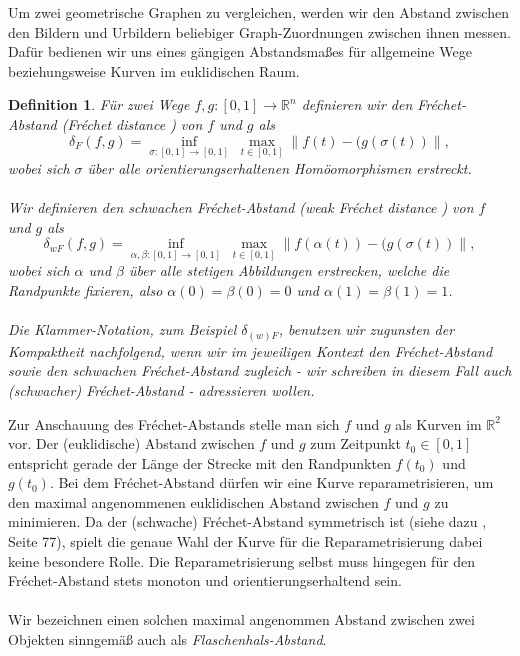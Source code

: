 \documentclass[a4paper, 12pt, twoside]{article}
\theoremstyle{Format1} %
\newtheorem{Def}{Definition}[section]       %
\begin{document}
	Um zwei geometrische Graphen zu vergleichen, werden wir den Abstand zwischen den Bildern und Urbildern beliebiger Graph-Zuordnungen zwischen ihnen
	messen. Dafür bedienen wir uns eines gängigen Abstandsmaßes für allgemeine Wege beziehungsweise Kurven im euklidischen Raum.

\begin{Def} \label{Definition Fréchet-Abstand}
	Für zwei Wege $ f, g: [0,1] \to \mathbb{R}^n $ definieren wir den \textit{Fréchet-Abstand (Fréchet distance \cite{Akitaya})} von $f$ und $g$ als
	$$ \delta_F(f,g) =  \inf_{\sigma:[0,1] \to [0,1]} \; \max_{t \in [0,1]} \lVert f(t)-(g(\sigma(t)) \rVert, $$
	wobei sich $\sigma $ über alle orientierungserhaltenen Homöomorphismen erstreckt.
	\\
	\\
	Wir definieren den \textit{schwachen Fréchet-Abstand (weak Fréchet distance \cite{Akitaya})} von $f$ und $g$ als
	$$\delta_{wF}(f,g) =\inf_{\alpha , \beta :[0,1] \to [0,1]} \; \max_{t \in [0,1]} \lVert f(\alpha(t))-(g(\sigma(t)) \rVert,$$
	wobei sich $\alpha$ und $\beta$ über alle stetigen Abbildungen erstrecken, welche die Randpunkte fixieren, also $\alpha(0) = \beta(0) = 0$
	und $\alpha(1) = \beta(1) = 1$.
	\\
	\\
	Die Klammer-Notation, zum Beispiel $ \delta_{(w)F} $, benutzen wir zugunsten der Kompaktheit nachfolgend, wenn wir im jeweiligen Kontext den Fréchet-Abstand sowie den schwachen Fréchet-Abstand zugleich -
	wir schreiben in diesem Fall auch \textit{(schwacher) Fréchet-Abstand} - adressieren wollen.
\end{Def}

Zur Anschauung des Fréchet-Abstands stelle man sich $f$ und $g$ als Kurven im $\mathbb{R}^2$ vor. Der (euklidische) Abstand zwischen $f$ und $g$ zum Zeitpunkt $t_0 \in [0,1]$ entspricht gerade der Länge der Strecke
mit den Randpunkten $f(t_0)$ und $g(t_0)$. Bei dem Fréchet-Abstand dürfen wir eine Kurve reparametrisieren, um den maximal angenommenen euklidischen Abstand zwischen $f$ und $g$ zu minimieren.
Da der (schwache) Fréchet-Abstand symmetrisch ist (siehe dazu \cite{Alt}, Seite 77), spielt die genaue Wahl der Kurve für die Reparametrisierung dabei keine besondere Rolle.
Die Reparametrisierung selbst muss hingegen für den Fréchet-Abstand stets monoton und orientierungserhaltend sein.
\\
\\
Wir bezeichnen einen solchen maximal angenommen Abstand zwischen zwei Objekten sinngemäß auch als \textit{Flaschenhals-Abstand}.
\end{document}
